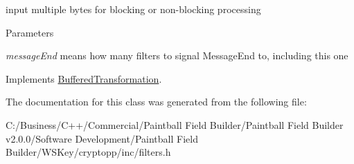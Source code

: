 input multiple bytes for blocking or non-\/blocking processing 
\begin{DoxyParams}{Parameters}
\item[{\em messageEnd}]means how many filters to signal MessageEnd to, including this one \end{DoxyParams}


Implements \hyperlink{class_buffered_transformation_ad396dcb42260f23125a35ec0e5d17d55}{BufferedTransformation}.

The documentation for this class was generated from the following file:\begin{DoxyCompactItemize}
\item 
C:/Business/C++/Commercial/Paintball Field Builder/Paintball Field Builder v2.0.0/Software Development/Paintball Field Builder/WSKey/cryptopp/inc/filters.h\end{DoxyCompactItemize}
